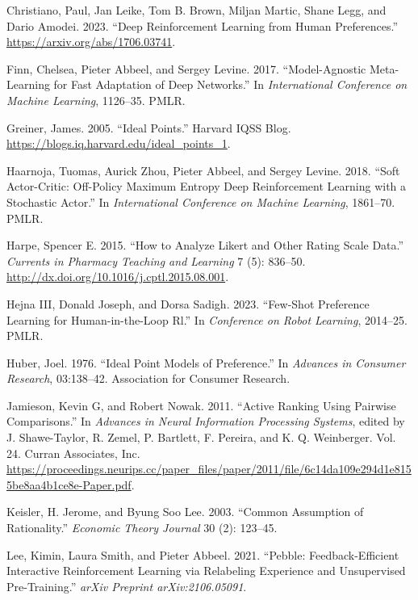 \documentclass[
  letterpaper,
  numbers=noenddot,
  DIV=11]{scrreprt}
\newlength{\cslhangindent}
\newenvironment{CSLReferences}[2] %
 {\begin{list}{}{%
  \setlength{\itemindent}{0pt}
  \setlength{\leftmargin}{0pt}
  \setlength{\parsep}{0pt}
  \ifodd #1
   \setlength{\leftmargin}{\cslhangindent}
   \setlength{\itemindent}{-1\cslhangindent}
  \fi
  \setlength{\itemsep}{#2\baselineskip}}}
 {\end{list}}
\theoremstyle{definition}
\theoremstyle{plain}
\theoremstyle{plain}
\theoremstyle{remark}
\begin{document}
\begin{CSLReferences}{1}{0}
Christiano, Paul, Jan Leike, Tom B. Brown, Miljan Martic, Shane Legg,
and Dario Amodei. 2023. {``Deep Reinforcement Learning from Human
Preferences.''} \url{https://arxiv.org/abs/1706.03741}.

Finn, Chelsea, Pieter Abbeel, and Sergey Levine. 2017. {``Model-Agnostic
Meta-Learning for Fast Adaptation of Deep Networks.''} In
\emph{International Conference on Machine Learning}, 1126--35. PMLR.

Greiner, James. 2005. {``Ideal Points.''} Harvard IQSS Blog.
\url{https://blogs.iq.harvard.edu/ideal_points_1}.

Haarnoja, Tuomas, Aurick Zhou, Pieter Abbeel, and Sergey Levine. 2018.
{``Soft Actor-Critic: Off-Policy Maximum Entropy Deep Reinforcement
Learning with a Stochastic Actor.''} In \emph{International Conference
on Machine Learning}, 1861--70. PMLR.

Harpe, Spencer E. 2015. {``How to Analyze Likert and Other Rating Scale
Data.''} \emph{Currents in Pharmacy Teaching and Learning} 7 (5):
836--50. \url{http://dx.doi.org/10.1016/j.cptl.2015.08.001}.

Hejna III, Donald Joseph, and Dorsa Sadigh. 2023. {``Few-Shot Preference
Learning for Human-in-the-Loop Rl.''} In \emph{Conference on Robot
Learning}, 2014--25. PMLR.

Huber, Joel. 1976. {``Ideal Point Models of Preference.''} In
\emph{Advances in Consumer Research}, 03:138--42. Association for
Consumer Research.

Jamieson, Kevin G, and Robert Nowak. 2011. {``Active Ranking Using
Pairwise Comparisons.''} In \emph{Advances in Neural Information
Processing Systems}, edited by J. Shawe-Taylor, R. Zemel, P. Bartlett,
F. Pereira, and K. Q. Weinberger. Vol. 24. Curran Associates, Inc.
\url{https://proceedings.neurips.cc/paper_files/paper/2011/file/6c14da109e294d1e8155be8aa4b1ce8e-Paper.pdf}.

Keisler, H. Jerome, and Byung Soo Lee. 2003. {``Common Assumption of
Rationality.''} \emph{Economic Theory Journal} 30 (2): 123--45.

Lee, Kimin, Laura Smith, and Pieter Abbeel. 2021. {``Pebble:
Feedback-Efficient Interactive Reinforcement Learning via Relabeling
Experience and Unsupervised Pre-Training.''} \emph{arXiv Preprint
arXiv:2106.05091}.


\end{CSLReferences}
\end{document}

